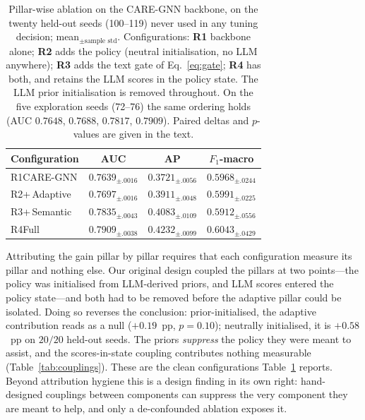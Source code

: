 \documentclass{conf}
\begin{document}
\begin{table}[H]
\centering
\footnotesize
\setlength{\tabcolsep}{4pt}
\caption{Pillar-wise ablation on the CARE-GNN backbone, on the twenty held-out
seeds (100--119) never used in any tuning decision; mean$_{\pm\text{sample
std}}$. Configurations: \textbf{R1} backbone alone; \textbf{R2} adds the policy
(neutral initialisation, no LLM anywhere); \textbf{R3} adds the text gate of
Eq.~\eqref{eq:gate}; \textbf{R4} has both, and retains the LLM scores in the
policy state. The LLM prior initialisation is removed throughout. On the five
exploration seeds (72--76) the same ordering holds (AUC $0.7648$, $0.7688$,
$0.7817$, $0.7909$). Paired deltas and $p$-values are given in the text.}
\label{tab:framework}
\begin{tabularx}{\linewidth}{@{}Xccc@{}}
\toprule
Configuration & AUC & AP & $F_1$-macro \\
\midrule
R1\;CARE-GNN    & $0.7639_{\pm.0016}$ & $0.3721_{\pm.0056}$ & $0.5968_{\pm.0244}$ \\
R2\;+\,Adaptive & $0.7697_{\pm.0016}$ & $0.3911_{\pm.0048}$ & $0.5991_{\pm.0225}$ \\
R3\;+\,Semantic & $0.7835_{\pm.0043}$ & $0.4083_{\pm.0109}$ & $0.5912_{\pm.0556}$ \\
R4\;Full        & $\mathbf{0.7909}_{\pm.0038}$ & $\mathbf{0.4232}_{\pm.0099}$ & $\mathbf{0.6043}_{\pm.0429}$ \\
\bottomrule
\end{tabularx}
\end{table}

Attributing the gain pillar by pillar requires that each configuration measure
its pillar and nothing else. Our original design coupled the pillars at two
points---the policy was initialised from LLM-derived priors, and LLM scores
entered the policy state---and both had to be removed before the adaptive
pillar could be isolated. Doing so reverses the conclusion: prior-initialised,
the adaptive contribution reads as a null ($+0.19$~pp, $p=0.10$); neutrally
initialised, it is $+0.58$~pp on $20/20$ held-out seeds. The priors
\emph{suppress} the policy they were meant to assist, and the scores-in-state
coupling contributes nothing measurable (Table~\ref{tab:couplings}). These are
the clean configurations Table~\ref{tab:framework} reports. Beyond attribution
hygiene this is a design finding in its own right: hand-designed couplings
between components can suppress the very component they are meant to help, and
only a de-confounded ablation exposes it.
\end{document}
